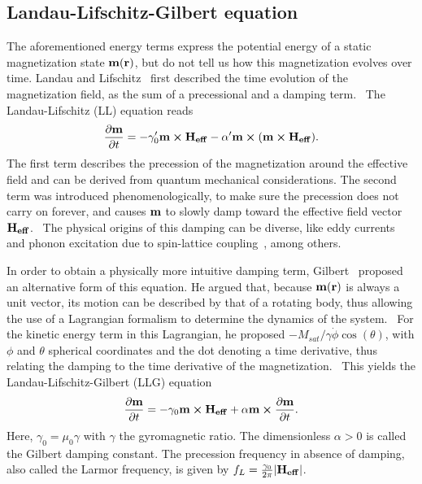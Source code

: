 \documentclass[11pt,a4paper,english]{article}
\begin{document}
\subsection{Landau-Lifschitz-Gilbert equation}
The aforementioned energy terms express the potential energy of a static magnetization state $\vb{m}(\vb{r})$, but do not tell us how this magnetization evolves over time. Landau and Lifschitz~\cite{lifdau} first described the time evolution of the magnetization field, as the sum of a precessional and a damping term.~\cite{abert2013discrete, NML_Carlton, phd_leliaert} The Landau-Lifschitz (LL) equation reads
\begin{equation}
    \frac{\partial \vb{m}}{\partial t} = - \gamma_0' \vb{m} \cross \vb{H_{eff}} - \alpha' \vb{m} \cross (\vb{m} \cross \vb{H_{eff}}) \mathrm{.}
    \label{eq:LL}
\end{equation}
The first term describes the precession of the magnetization around the effective field and can be derived from quantum mechanical considerations.  The second term was introduced phenomenologically, to make sure the precession does not carry on forever, and causes $\vb{m}$ to slowly damp toward the effective field vector $\vb{H_{eff}}$.~\cite{NML_Carlton}  The physical origins of this damping can be diverse, like eddy currents~\cite{phd_leliaert} and phonon excitation due to spin-lattice coupling~\cite{phd_leliaert}, among others. %
\par
In order to obtain a physically more intuitive damping term, Gilbert~\cite{Gilbert1955ALF} proposed an alternative form of this equation. He argued that, because $\vb{m}(\vb{r})$ is always a unit vector, its motion can be described by that of a rotating body, thus allowing the use of a Lagrangian formalism to determine the dynamics of the system.~\cite{abert2013discrete} For the kinetic energy term in this Lagrangian, he proposed $-M_{sat}/\gamma \dot{\phi} \cos(\theta)$, with $\phi$ and $\theta$ spherical coordinates and the dot denoting a time derivative, thus relating the damping to the time derivative of the magnetization.~\cite{abert2013discrete} This yields the Landau-Lifschitz-Gilbert (LLG) equation~\cite{ThermFluc_SingleDomain, phd_leliaert, LEL-17b}
\begin{equation}
    \frac{\partial \vb{m}}{\partial t} = - \gamma_0 \vb{m} \cross \vb{H_{eff}} + \alpha \vb{m} \cross \frac{\partial \vb{m}}{\partial t} \mathrm{.}
    \label{eq:LLG}
\end{equation}
Here, $\gamma_0=\mu_0 \gamma$ with $\gamma$ the gyromagnetic ratio. The dimensionless $\alpha > 0$ is called the Gilbert damping constant. The precession frequency in absence of damping, also called the Larmor frequency, is given by  $f_L=\frac{\gamma_0}{2\pi}\abs{\vb{H_{eff}}}$.~\cite{phd_leliaert}
\end{document}
